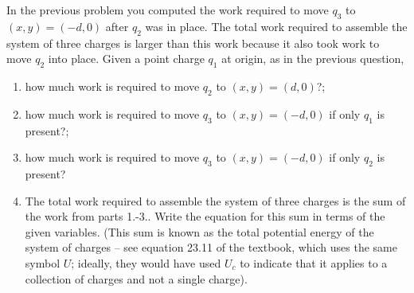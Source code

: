 \documentclass{article}
\begin{document}
In the previous problem you computed the work required to move $q_3$ to $(x,y) = (-d,0)$ after $q_2$ was in place. The total work required to assemble the system of three charges is larger than this work because it also took work to move $q_2$ into place. Given a point charge $q_1$ at origin, as in the previous question,

\begin{enumerate}

  \item how much work is required to move $q_2$ to $(x,y) = (d,0)$?;

        \ifsolutions
        \else
        \vskip 36pt
        \fi

  \item how much work is required to move $q_3$ to $(x,y) = (-d,0)$ if only $q_1$ is present?;

        \ifsolutions
        \else
        \vskip 36pt
        \fi

  \item how much work is required to move $q_3$ to $(x,y) = (-d,0)$ if only $q_2$ is present?

        \ifsolutions
        \else
        \vskip 36pt
        \fi

  \item The total work required to assemble the system of three charges is the sum of the work from parts 1.-3.. Write the equation for this sum in terms of the given variables. (This sum is known as the total potential energy of the system of charges -- see equation 23.11 of the textbook, which uses the same symbol $U$; ideally, they would have used $U_c$ to indicate that it applies to a collection of charges and not a single charge).

\end{enumerate}
\end{document}
